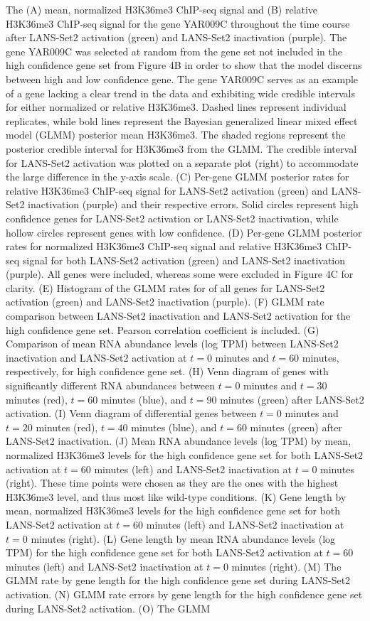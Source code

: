 \documentclass[11pt]{biorxiv}
\begin{document}
\noindent The (A) mean, normalized H3K36me3 ChIP-seq signal and (B) relative H3K36me3 ChIP-seq signal for the gene YAR009C throughout the time course after LANS-Set2 activation (green) and LANS-Set2 inactivation (purple). The gene YAR009C was selected at random from the gene set not included in the high confidence gene set from Figure 4B in order to show that the model discerns between high and low confidence gene. The gene YAR009C serves as an example of a gene lacking a clear trend in the data and exhibiting wide credible intervals for either normalized or relative H3K36me3. Dashed lines represent individual replicates, while bold lines represent the Bayesian generalized linear mixed effect model (GLMM) posterior mean H3K36me3. The shaded regions represent the posterior credible interval for H3K36me3 from the GLMM. The credible interval for LANS-Set2 activation was plotted on a separate plot (right) to accommodate the large difference in the y-axis scale. (C) Per-gene GLMM posterior rates for relative H3K36me3 ChIP-seq signal for LANS-Set2 activation (green) and LANS-Set2 inactivation (purple) and their respective errors. Solid circles represent high confidence genes for LANS-Set2 activation or LANS-Set2 inactivation, while hollow circles represent genes with low confidence. (D) Per-gene GLMM posterior rates for normalized H3K36me3 ChIP-seq signal and relative H3K36me3 ChIP-seq signal for both LANS-Set2 activation (green) and LANS-Set2 inactivation (purple). All genes were included, whereas some were excluded in Figure 4C for clarity. (E) Histogram of the GLMM rates for of all genes for LANS-Set2 activation (green) and LANS-Set2 inactivation (purple). (F) GLMM rate comparison between LANS-Set2 inactivation and LANS-Set2 activation for the high confidence gene set. Pearson correlation coefficient is included. (G) Comparison of mean RNA abundance levels (log TPM) between LANS-Set2 inactivation and LANS-Set2 activation at $t=0$ minutes and $t=60$ minutes, respectively, for high confidence gene set. (H) Venn diagram of genes with significantly different RNA abundances between $t=0$ minutes and $t=30$ minutes (red), $t=60$ minutes (blue), and $t=90$ minutes (green) after LANS-Set2 activation. (I) Venn diagram of differential genes between $t=0$ minutes and $t=20$ minutes (red), $t=40$ minutes (blue), and $t=60$ minutes (green) after LANS-Set2 inactivation. (J) Mean RNA abundance levels (log TPM) by mean, normalized H3K36me3 levels for the high confidence gene set for both LANS-Set2 activation at $t=60$ minutes (left) and LANS-Set2 inactivation at $t=0$ minutes (right). These time points were chosen as they are the ones with the highest H3K36me3 level, and thus most like wild-type conditions. (K) Gene length by mean, normalized H3K36me3 levels for the high confidence gene set for both LANS-Set2 activation at $t=60$ minutes (left) and LANS-Set2 inactivation at $t=0$ minutes (right). (L) Gene length by mean RNA abundance levels (log TPM) for the high confidence gene set for both LANS-Set2 activation at $t=60$ minutes (left) and LANS-Set2 inactivation at $t=0$ minutes (right). (M) The GLMM rate by gene length for the high confidence gene set during LANS-Set2 activation. (N) GLMM rate errors by gene length for the high confidence gene set during LANS-Set2 activation. (O) The GLMM 
\end{document}
